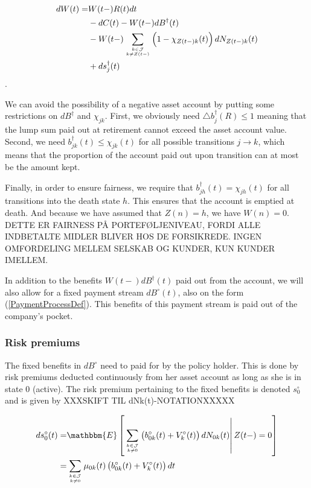 \documentclass{book}
\newcommand{\1}[1]{\mathbbm{1}_{\left\lbrace #1 \right\rbrace}}
\newcommand{\econd}[2][def]{\mathbbm{E} \left[ \left. #1 \right| #2 \right]}
\theoremstyle{break}
\theoremstyle{remark}
\newenvironment{remark}
  {\pushQED{\qed}\renewcommand{\qedsymbol}{\scalebox{1.4}{$\circ$}}\remarkx}
  {\popQED\endremarkx}
\numberwithin{equation}{section}
\begin{document}
\begin{align*}
dW(t) =& W(t-) R(t) dt \\
&- dC(t) - W(t-) dB^\dagger(t) \\
&- W(t-) \sum_{k \in \mathcal{J} \atop k \neq Z(t-)} \left( 1 - \chi_{Z(t-)k}(t) \right) dN_{Z(t-)k}(t) \\
&+ ds_j^\dagger(t)
\end{align*}.

\begin{remark}
	We can avoid the possibility of a negative asset account by putting some restrictions on $dB^{\dagger}$ and $\chi_{jk}$. First, we obviously need $\triangle b_j^{\dagger}(R) \leq 1$ meaning that the lump sum paid out at retirement cannot exceed the asset account value. Second, we need $b_{jk}^{\dagger}(t) \leq \chi_{jk}(t)$ for all possible transitions $j \to k$, which means that the proportion of the account paid out upon transition can at most be the amount kept.
	
	Finally, in order to ensure fairness, we require that $b_{jh}^{\dagger}(t) = \chi_{jh}(t)$ for all transitions into the death state $h$. This ensures that the account is emptied at death. And because we have assumed that $Z(n)=h$, we have $W(n)=0$. DETTE ER FAIRNESS PÅ PORTEFØLJENIVEAU, FORDI ALLE INDBETALTE MIDLER BLIVER HOS DE FORSIKREDE. INGEN OMFORDELING MELLEM SELSKAB OG KUNDER, KUN KUNDER IMELLEM.
\end{remark}

In addition to the benefits $W(t-)dB^{\dagger}(t)$ paid out from the account, we will also allow for a fixed payment stream $dB^{\circ}(t)$, also on the form (\ref{PaymentProcessDef}). This benefits of this payment stream is paid out of the company's pocket.

\subsubsection{Risk premiums}

The fixed benefits in $dB^\circ$ need to paid for by the policy holder. This is done by risk premiums deducted continuously from her asset account as long as she is in state 0 (active). The risk premium pertaining to the fixed benefits is denoted $s_0^\circ$ and is given by XXXSKIFT TIL dNk(t)-NOTATIONXXXXX

\begin{align*}
    ds_0^\circ(t) =& \econd[\sum_{k \in \mathcal{J} \atop k \neq 0} \left( b_{0k}^\circ(t) + V_k^\circ(t) \right) dN_{0k}(t)]{Z(t-)=0} \\ =&\sum_{k \in \mathcal{J} \atop k \neq 0} \mu_{0k}(t) \left( b_{0k}^\circ(t) + V_k^\circ(t) \right) dt
\end{align*}
\end{document}
